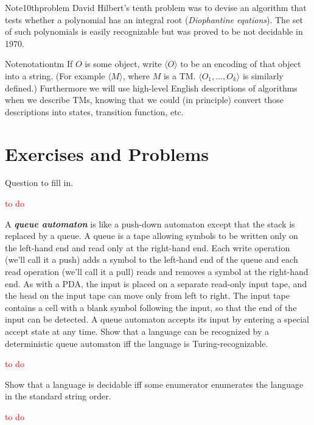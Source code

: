 \begin{reference}{Note}{10thproblem}
  David Hilbert's tenth problem was to devise an algorithm that tests whether a polynomial has an integral root (\textit{Diophantine eqations}). The set of such polynomials is easily recognizable but was proved to be not decidable in 1970.
\end{reference}

\begin{reference}{Note}{notationtm}
  If $O$ is some object, write $\langle O\rangle$ to be an encoding of that object into a string. (For example $\langle M\rangle$, where $M$ is a TM. $\langle O_1,\dots,O_k\rangle$ is similarly defined.) Furthermore we will use high-level English descriptions of algorithms when we describe TMs, knowing that we could (in principle) convert those descriptions into states, transition function, etc.
\end{reference}

\section*{Exercises and Problems}

\setcounter{exercise}{11}

\begin{exercise}{3.12}
  Question to fill in.
\end{exercise}

\textcolor{red}{to do}

\setcounter{exercise}{13}

\begin{exercise}{3.14}
  A \textbf{\textit{queue automaton}} is like a push-down automaton except that the stack is replaced by a queue. A queue is a tape allowing symbols to be written only on the left-hand end and read only at the right-hand end. Each write operation (we’ll call it a push) adds a symbol to the left-hand end of the queue and each read operation (we’ll call it a pull) reads and removes a symbol at the right-hand end. As with a PDA, the input is placed on a separate read-only input tape, and the head on the input tape can move only from left to right. The input tape contains a cell with a blank symbol following the input, so that the end of the input can be detected. A queue automaton accepts its input by entering a special accept state at any time. Show that a language can be recognized by a deterministic queue automaton iff the language is Turing-recognizable.
\end{exercise}

\textcolor{red}{to do}

\setcounter{exercise}{17}

\begin{exercise}{3.18}
  Show that a language is decidable iff some enumerator enumerates the language in the standard string order.
\end{exercise}

\textcolor{red}{to do}

